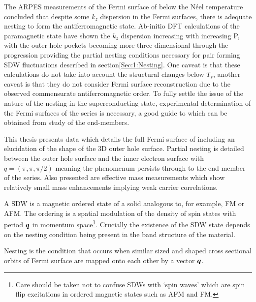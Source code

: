 The ARPES measurements of the Fermi surface of \BaFeAs below the N\'eel temperature concluded that despite some $k_z$ dispersion in the Fermi surfaces, there is adequate nesting to form the antiferromagnetic state. Ab-initio DFT calculations\cite{Shishido2010} of the paramagnetic state have shown the $k_z$ dispersion increasing with increasing P, with the outer hole pockets becoming more three-dimensional through the progression providing the partial nesting conditions necessary for pair forming SDW fluctuations described in section\ref{Sec:1:Nesting}. One caveat is that these calculations do not take into account the structural changes below $T_s$, another caveat is that they do not consider Fermi surface reconstruction due to the observed commensurate antiferromagnetic order. To fully settle the issue of the nature of the nesting in the superconducting state, experimental determination of the Fermi surfaces of the series is necessary, a good guide to which can be obtained from study of the end-members.


This thesis presents data which details the full Fermi surface of \BaFeP including an elucidation of the shape of the 3D outer hole surface. Partial nesting is detailed between the outer hole surface and the inner electron surface with $q=(\pi, \pi, \pi/2)$ meaning the phenomenum persists through to the end member of the series. Also presented are effective mass measurements which show relatively small mass enhancements implying weak carrier correlations.




A \acf{SDW} is a magnetic ordered state of a solid analogous to, for example, \acf{FM} or \acf{AFM}. The ordering is a spatial modulation of the density of spin states with period $\boldsymbol{q}$ in momentum space\footnote{Care should be taken not to confuse \acp{SDW} with `spin waves' which are spin flip excitations in ordered magnetic states such as \ac{AFM} and \ac{FM}.}. Crucially the existence of the \ac{SDW} state depends on the nesting condition being present in the band structure of the material.

Nesting is the condition that occurs when similar sized and shaped cross sectional orbits of Fermi surface are mapped onto each other by a vector $\boldsymbol{q}$.
